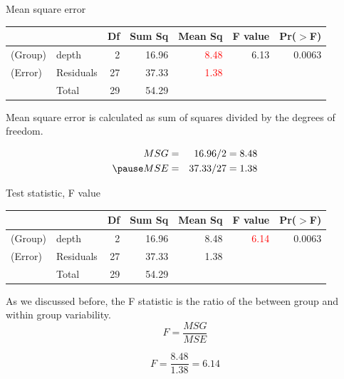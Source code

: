 \documentclass[
  ignorenonframetext,
]{beamer}
\begin{document}
\begin{frame}{Mean square error}
\protect\hypertarget{mean-square-error}{}
\begin{center}
\begin{tabular}{ll rrrrr}
\hline
            &           & Df    & Sum Sq    & Mean Sq   & F value   & Pr($>$F) \\ 
\hline
(\alert{G}roup)     & depth         & 2     & 16.96 & \textcolor{red}{8.48}         & 6.13  & 0.0063 \\ 
(\alert{E}rror)     & Residuals     & 27    & 37.33     & \textcolor{red}{1.38}         &       &  \\ 
\hline
            & \alert{T}otal & 29    & 54.29 \\
\end{tabular}
\end{center}

Mean square error is calculated as sum of squares divided by the degrees
of freedom.

\pause

\begin{eqnarray*}
MSG &=& 16.96 / 2 = 8.48 \\
\pause
MSE &=& 37.33 / 27 = 1.38
\end{eqnarray*}
\end{frame}

\begin{frame}{Test statistic, F value}
\protect\hypertarget{test-statistic-f-value}{}
\begin{center}
\begin{tabular}{ll rrrrr}
\hline
            &           & Df    & Sum Sq    & Mean Sq   & F value   & Pr($>$F) \\ 
\hline
(\alert{G}roup)     & depth         & 2     & 16.96 & 8.48      & \textcolor{red}{6.14}     & 0.0063 \\ 
(\alert{E}rror)     & Residuals     & 27    & 37.33     & 1.38      &       &  \\ 
\hline
            & \alert{T}otal & 29    & 54.29 \\
\end{tabular}
\end{center}

As we discussed before, the F statistic is the ratio of the between
group and within group variability. \[ F = \frac{MSG}{MSE} \]

\pause

\[ F = \frac{8.48}{1.38} = 6.14 \]
\end{frame}
\end{document}
